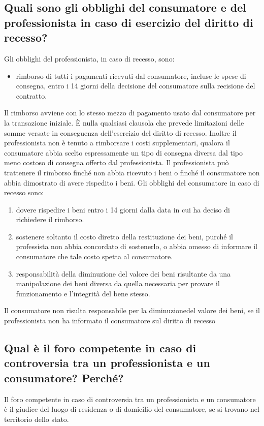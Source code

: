 \subsection{Quali sono gli obblighi del consumatore e del professionista in caso di esercizio del diritto di
recesso?}
Gli obblighi del professionista, in caso di recesso, sono:
\begin{itemize}
    \item rimborso di tutti i pagamenti ricevuti dal consumatore, incluse le spese di consegna, entro i 14 giorni della decisione del consumatore sulla recisione del contratto.
\end{itemize}
Il rimborso avviene con lo stesso mezzo di pagamento usato dal consumatore per la transazione iniziale.
È nulla qualsiasi clausola che prevede limitazioni delle somme versate in conseguenza dell'esercizio del diritto di recesso.
Inoltre il professionista non è tenuto a rimborsare i costi supplementari, qualora il consumatore abbia scelto espressamente un tipo di consegna diversa dal tipo meno costoso di consegna offerto dal professionista.
Il professionista può trattenere il rimborso finché non abbia ricevuto i beni o finché il consumatore non abbia dimostrato di avere rispedito i beni.
\newline
\newline
Gli obblighi del consumatore in caso di recesso sono:
\begin{enumerate}
    \item dovere rispedire i beni entro i 14 giorni dalla data in cui ha deciso di richiedere il rimborso.
    \item sostenere soltanto il costo diretto della restituzione dei beni, purché il professista non abbia concordato di sostenerlo, o abbia omesso di informare il consumatore che tale costo spetta al consumatore.
    \item responsabilità della diminuzione del valore dei beni risultante da una manipolazione dei beni diversa da quella necessaria per provare il funzionamento e l'integrità del bene stesso.
\end{enumerate}
Il consumatore non risulta responsabile per la diminuzionedel valore dei beni, se il professionista non ha informato il consumatore sul diritto di recesso

\subsection{Qual è il foro competente in caso di controversia tra un professionista e un consumatore?
Perché?}
Il foro competente in caso di controversia tra un professionista e un consumatore è il giudice del luogo di residenza o di domicilio del consumatore, se si trovano nel territorio dello stato.
